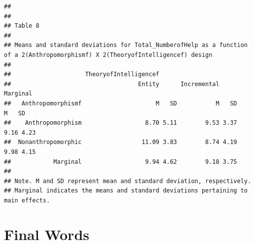\documentclass[
]{book}
\begin{document}
\begin{verbatim}
## 
## 
## Table 8 
## 
## Means and standard deviations for Total_NumberofHelp as a function of a 2(Anthropomorphismf) X 2(TheoryofIntelligencef) design 
## 
##                     TheoryofIntelligencef                                    
##                                    Entity      Incremental      Marginal     
##   Anthropomorphismf                     M   SD           M   SD        M   SD
##    Anthropomorphism                  8.70 5.11        9.53 3.37     9.16 4.23
##  Nonanthropomorphic                 11.09 3.83        8.74 4.19     9.98 4.15
##            Marginal                  9.94 4.62        9.18 3.75              
## 
## Note. M and SD represent mean and standard deviation, respectively. 
## Marginal indicates the means and standard deviations pertaining to main effects.
\end{verbatim}

\hypertarget{final-words}{%
\chapter{Final Words}\label{final-words}}

  
\end{document}
